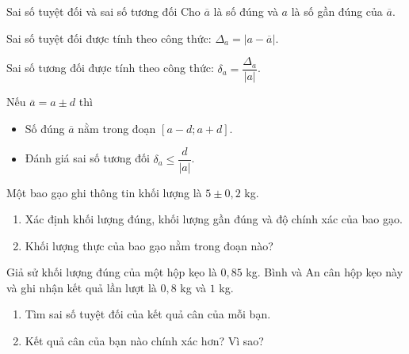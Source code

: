 \begin{dang}{Sai số tuyệt đối và sai số tương đối}
	Cho $\overline{a}$ là số đúng và $a$ là số gần đúng của $\overline{a}$. 
	\begin{listEX}[1]
		\item [\ding{172}] Sai số tuyệt đối được tính theo công thức: $\Delta_a=\big|a-\overline{a}\big|$. 
		\item [\ding{173}] Sai số tương đối được tính theo công thức: $\delta_{a}=\dfrac{\Delta_a}{|a|}$.
		\item [\ding{173}] Nếu  $\overline{a}=a \pm d$ thì 
		\begin{itemize}
			\item [$\bullet$] Số đúng $\overline{a}$ nằm trong đoạn $\left[a-d;a+d\right]$.
			\item [$\bullet$] Đánh giá sai số tương đối $\delta_{a} \le \dfrac{d}{|a|}$.
		\end{itemize} 
	\end{listEX}
	
\end{dang}

\begin{vd}%
	Một bao gạo ghi thông tin khối lượng là $ 5\pm 0{,}2 $ kg.
	\begin{enumerate}
		\item Xác định khối lượng đúng, khối lượng gần đúng và độ chính xác của bao gạo.
		\item Khối lượng thực của bao gạo nằm trong đoạn nào?
	\end{enumerate}
\end{vd} 

\begin{vd}
	Giả sử khối lượng đúng của một hộp kẹo là $0{,}85$ kg. Bình và An cân hộp kẹo này và ghi nhận kết quả lần lượt là $0{,}8$ kg và $1$ kg.
	\begin{enumerate}
		\item Tìm sai số tuyệt đối của kết quả cân của mỗi bạn.
		\item Kết quả cân của bạn nào chính xác hơn? Vì sao?
	\end{enumerate}
\end{vd} 

